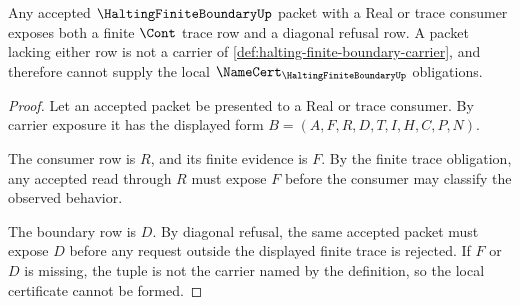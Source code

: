 \begin{theorem}
\label{thm:halting-finite-boundary-consumer-inversion}
Any accepted $\HaltingFiniteBoundaryUp$ packet with a Real or trace consumer exposes both a finite $\Cont$ trace row and a diagonal refusal row. A packet lacking either row is not a carrier of \autoref{def:halting-finite-boundary-carrier}, and therefore cannot supply the local $\NameCert_{\HaltingFiniteBoundaryUp}$ obligations.
\end{theorem}
\begin{proof}
Let an accepted packet be presented to a Real or trace consumer. By carrier exposure it has the displayed form $B=(A,F,R,D,T,I,H,C,P,N)$.

The consumer row is $R$, and its finite evidence is $F$. By the finite trace obligation, any accepted read through $R$ must expose $F$ before the consumer may classify the observed behavior.

The boundary row is $D$. By diagonal refusal, the same accepted packet must expose $D$ before any request outside the displayed finite trace is rejected. If $F$ or $D$ is missing, the tuple is not the carrier named by the definition, so the local certificate cannot be formed.
\end{proof}




